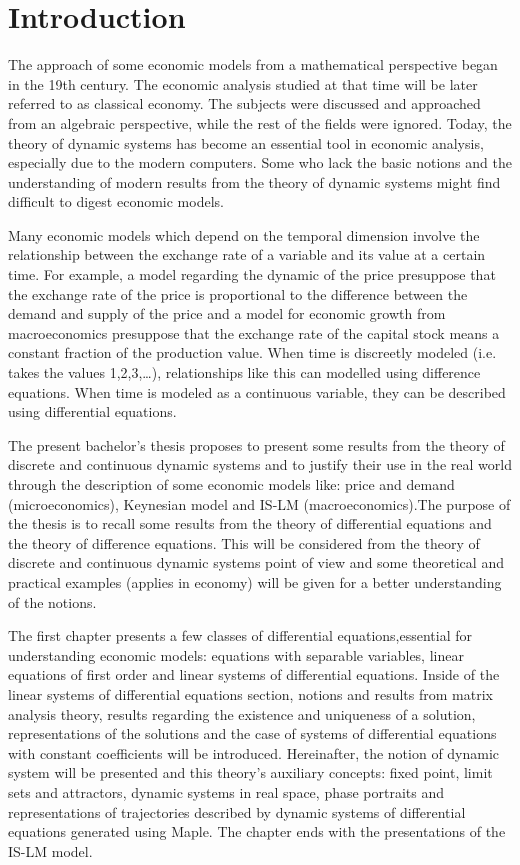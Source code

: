 \documentclass[a4paper,11pt]{report}
\begin{document}
\chapter*{Introduction}
 The approach of some economic models from a mathematical perspective began in the 19th century. The economic analysis studied at that time will be later referred to as classical economy. The subjects were discussed and approached from an algebraic perspective, while the rest of the fields were ignored. Today, the theory of dynamic systems has become an essential tool in economic analysis, especially due to the modern computers. Some who lack the basic notions and the understanding of modern results from the theory of dynamic systems might find difficult to digest economic models. \par
 Many economic models which depend on the temporal dimension involve the relationship between the exchange rate of a variable and its value at a certain time. For example, a model regarding the dynamic of the price presuppose that the exchange rate of the price is proportional to the difference between the demand and supply of the price and a model for economic growth from macroeconomics presuppose that the exchange rate of the capital stock means a constant fraction of the production value. When time is discreetly modeled (i.e. takes the values 1,2,3,…), relationships like this can modelled using difference equations. When time is modeled as a continuous variable, they can be described using differential equations.\par 
The present bachelor’s thesis proposes to present some results from the theory of discrete and continuous dynamic systems and to justify their use in the real world through the description of some economic models like: price and demand (microeconomics), Keynesian model and IS-LM (macroeconomics).The purpose of the thesis is to recall some results from the theory of differential equations and the theory of difference equations. This will be considered from the theory of discrete and continuous dynamic systems point of view and some theoretical and practical examples (applies in economy) will be given for a better understanding of the notions.\par
The first chapter presents a few classes of differential equations,essential for understanding economic models: equations with separable variables, linear equations of first order and linear systems of differential equations. Inside of the linear systems of differential equations section, notions and results from matrix analysis theory, results regarding the existence and uniqueness of a solution, representations of the solutions and the case of systems of differential equations with constant coefficients will be introduced. Hereinafter, the notion of dynamic system will be presented and this theory’s auxiliary concepts: fixed point, limit sets and attractors, dynamic systems in real space, phase portraits and representations of trajectories described by  dynamic systems of differential equations generated using Maple. The chapter ends with the presentations of the IS-LM model.\par
\end{document}
